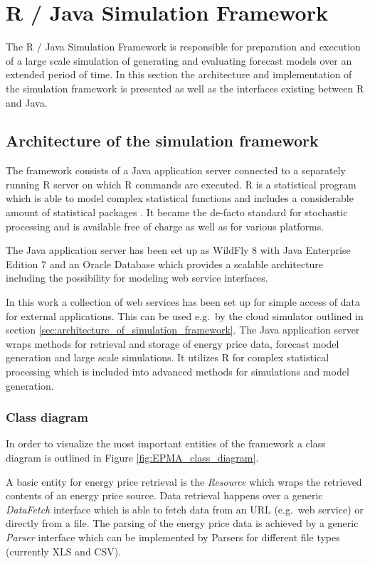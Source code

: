 \section{R / Java Simulation Framework}

The R / Java Simulation Framework is responsible for preparation and execution of a large scale simulation of generating and evaluating forecast models over an extended period of time. In this section the architecture and implementation of the simulation framework is presented as well as the interfaces existing between R and Java. 


\subsection{Architecture of the simulation framework}

The framework consists of a Java application server connected to a separately running R server on which R commands are executed. R is a statistical program which is able to model complex statistical functions and includes a considerable amount of statistical packages \cite{r2016project}. It became the de-facto standard for stochastic processing and is available free of charge as well as for various platforms. 

The Java application server has been set up as WildFly 8 \cite{red2016wildfly} with Java Enterprise Edition 7 \cite{oracle2016java} and an Oracle Database \cite{oracle2016database} which provides a scalable architecture including the possibility for modeling web service interfaces. 

In this work a collection of web services has been set up for simple access of data for external applications. This can be used e.g.~by the cloud simulator outlined in section \ref{sec:architecture_of_simulation_framework}. The Java application server wraps methods for retrieval and storage of energy price data, forecast model generation and large scale simulations. It utilizes R for complex statistical processing which is included into advanced methods for simulations and model generation. 

\subsubsection{Class diagram}

In order to visualize the most important entities of the framework a class diagram is outlined in Figure \ref{fig:EPMA_class_diagram}.

A basic entity for energy price retrieval is the \textit{Resource} which wraps the retrieved contents of an energy price source. Data retrieval happens over a generic \textit{DataFetch} interface which is able to fetch data from an URL (e.g.~web service) or directly from a file. The parsing of the energy price data is achieved by a generic \textit{Parser} interface which can be implemented by Parsers for different file types (currently XLS and CSV). 

